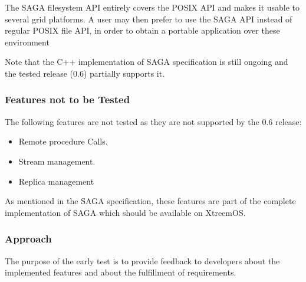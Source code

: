 The SAGA filesystem API entirely covers the POSIX API and makes it
usable to several grid platforms. A user may then prefer to use
the SAGA API instead of regular POSIX file API, in order to obtain a
portable application over these environment


Note that the C++ implementation of SAGA specification
is still ongoing and the tested release (0.6) partially supports 
it. 

\subsubsection{Features not to be Tested}
The following features are not tested as they are not supported by
the 0.6 release:
\begin{itemize}
 \item Remote procedure Calls.
 \item Stream management.
 \item  Replica management
\end{itemize}
As mentioned in the SAGA specification, these features are part
of the complete implementation of SAGA which should be available on XtreemOS.

\subsubsection{Approach}

The purpose of the early test is to provide feedback to developers
about the implemented features and about the fulfillment of
requirements.  

